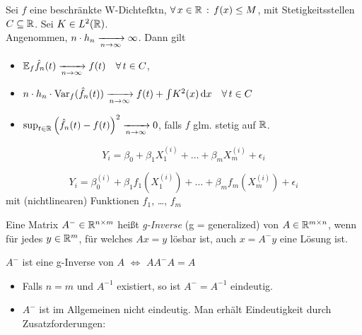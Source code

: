 \documentclass{cheat-sheet}
\newcommand{\E}{\mathbb{E}} %
\DeclareMathOperator{\var}{Var} %
\begin{document}
\begin{satz}
  Sei $f$ eine beschränkte W-Dichtefktn, $\forall \, {x \in \mathbb{R}} \,:\, f(x) \leq M$, mit Stetigkeitsstellen $C \subseteq \mathbb{R}$.
  Sei $K \in L^2(\mathbb{R})$. \\
  Angenommen, $n \cdot h_n \xrightarrow[n \to \infty]{} \infty$.
  Dann gilt
  \begin{itemize}
    \item $\E_f \hat{f}_n(t) \xra[n \to \infty]{} f(t) \quad \forall \, t \in C$,
    \item $n \cdot h_n \cdot \var_f (\hat{f}_n(t)) \xra[n \to \infty]{} f(t) + \IInt{K^2(x)}{x} \quad \forall \, t \in C$
    \item $\sup_{t \in \mathbb{R}} \left( \hat{f}_n(t) - f(t) \right)^2 \xrightarrow[n \to \infty]{} 0$, falls $f$ glm. stetig auf $\mathbb{R}$.
  \end{itemize}
\end{satz}

\fi


\begin{bsp}
  \[ Y_i = \beta_0 + \beta_1 X_1^{(i)} + \ldots + \beta_m X_m^{(i)} + \epsilon_i \]
\end{bsp}


\begin{bsp}
  \[ Y_i = \beta_0^{(i)} + \beta_1 f_1(X_1^{(i)}) + \ldots + \beta_m f_m(X_m^{(i)}) + \epsilon_i \]
  mit (nichtlinearen) Funktionen $f_1$, \ldots, $f_m$
\end{bsp}


\begin{defn}
  Eine Matrix $A^{-} \in \mathbb{R}^{n \times m}$ heißt \emph{g-Inverse} (g = generalized) von $A \in \mathbb{R}^{m \times n}$, wenn für jedes $y \in \mathbb{R}^m$, für welches $Ax = y$ lösbar ist, auch $x = A^{-} y$ eine Lösung ist.
\end{defn}

\begin{satz}
  $A^{-}$ ist eine g-Inverse von $A$ $\iff$ $A A^{-} A = A$
\end{satz}

\begin{bem}
  \begin{itemize}
    \item Falls $n = m$ und $A^{-1}$ existiert, so ist $A^{-} = A^{-1}$ eindeutig.
    \item $A^{-}$ ist im Allgemeinen nicht eindeutig.
    Man erhält Eindeutigkeit durch Zusatzforderungen:
  \end{itemize}
\end{bem}
\end{document}
